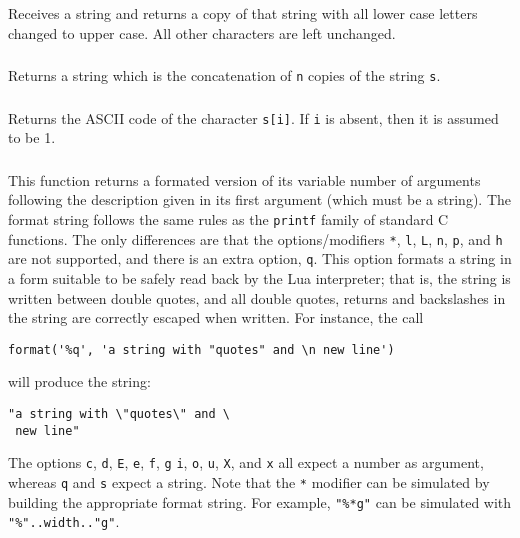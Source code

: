 \subsubsection*{}
Receives a string and returns a copy of that string with all
lower case letters changed to upper case.
All other characters are left unchanged.

\subsubsection*{}
Returns a string which is the concatenation of \verb-n- copies of 
the string \verb-s-.

\subsubsection*{}
Returns the ASCII code of the character \verb's[i]'.
If \verb'i' is absent, then it is assumed to be 1.

\subsubsection*{}
\label{format}
This function returns a formated version of its variable number of arguments
following the description given in its first argument (which must be a string). 
The format string follows the same rules as the \verb'printf' family of
standard C functions.
The only differences are that the options/modifiers
\verb'*', \verb'l', \verb'L', \verb'n', \verb'p',
and \verb'h' are not supported,
and there is an extra option, \verb'q'.
This option formats a string in a form suitable to be safely read
back by the Lua interpreter;
that is,
the string is written between double quotes,
and all double quotes, returns and backslashes in the string
are correctly escaped when written.
For instance, the call
\begin{verbatim}
format('%q', 'a string with "quotes" and \n new line')
\end{verbatim}
will produce the string:
\begin{verbatim}
"a string with \"quotes\" and \
 new line"
\end{verbatim}

The options \verb'c', \verb'd', \verb'E', \verb'e', \verb'f',
\verb'g' \verb'i', \verb'o', \verb'u', \verb'X', and \verb'x' all
expect a number as argument,
whereas \verb'q' and \verb's' expect a string.
Note that the \verb'*' modifier can be simulated by building
the appropriate format string.
For example, \verb|"%*g"| can be simulated with
\verb|"%"..width.."g"|.

